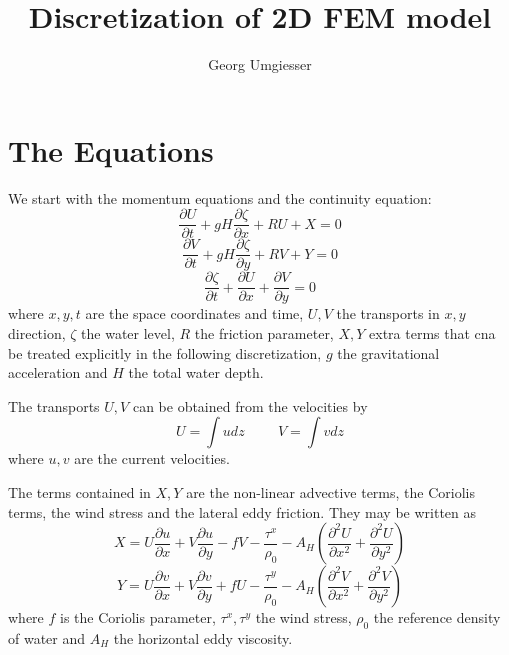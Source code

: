 \documentclass[12pt]{article}
\title{Discretization of 2D FEM model}
\author{Georg Umgiesser}
\newcommand{\tdif}[1] {\frac{\partial #1}{\partial t}}
\newcommand{\xdif}[1] {\frac{\partial #1}{\partial x}}
\newcommand{\ydif}[1] {\frac{\partial #1}{\partial y}}
\newcommand{\xxdif}[1] {\frac{\partial^2 #1}{\partial x^2}}
\newcommand{\yydif}[1] {\frac{\partial^2 #1}{\partial y^2}}
\newcommand{\rhon} {\rho_0}
\newcommand{\beq} {\begin{equation}}
\newcommand{\eeq} {\end{equation}}
\newcommand{\aush} {A_H}
\begin{document}
\maketitle



\section*{The Equations}


We start with the momentum equations and the continuity equation:
\beq
\tdif{U} + gH \xdif{\zeta} + RU + X = 0
\eeq
\beq
\tdif{V} + gH \ydif{\zeta} + RV + Y = 0
\eeq
\beq
\tdif{\zeta} + \xdif{U} + \ydif{V} = 0
\eeq
where $x,y,t$ are the space coordinates and time, $U,V$ the
transports in $x,y$ direction, $\zeta$ the water level,
$R$ the friction parameter, $X,Y$ extra terms that cna be treated
explicitly in the following discretization, $g$ the gravitational
acceleration and $H$ the total water depth.

The transports $U,V$ can be obtained from the velocities by
\beq
U = \int u dz \hspace{1cm} V = \int v dz
\eeq
where $u,v$ are the current velocities.

The terms contained in $X,Y$ are the non-linear advective terms, the
Coriolis terms, the wind stress and the lateral eddy friction.
They may be written as
\beq
X = U \xdif{u} + V \ydif{u} - f V - \frac{\tau^x}{\rhon}
	- \aush ( \xxdif{U} + \yydif{U} )
\eeq
\beq
Y = U \xdif{v} + V \ydif{v} + f U - \frac{\tau^y}{\rhon}
	- \aush ( \xxdif{V} + \yydif{V} )
\eeq
where $f$ is the Coriolis parameter, $\tau^x,\tau^y$ the
wind stress, $\rhon$ the reference density of water and
$\aush$ the horizontal eddy viscosity.
\end{document}
